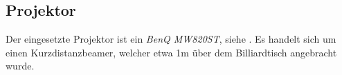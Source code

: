 \subsection{Projektor}\label{kap:projector}

Der eingesetzte Projektor ist ein \emph{BenQ MW820ST}, siehe \cite{projectorcentral:benq_mw820st}.
Es handelt sich um einen Kurzdistanzbeamer, welcher etwa 1\si{\metre} über dem Billiardtisch angebracht wurde.

